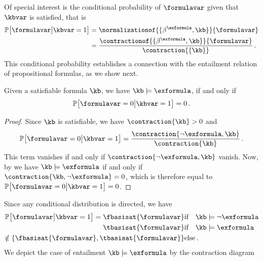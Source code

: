 % 
Of special interest is the conditional probability of $\formulavar$ given that $\kbvar$ is satisfied, that is
\begin{align*}
    \condprobof{\formulavar}{\kbvar=1}
    & = \normalizationof{\{\bencodingof{\exformula} ,\kb\}}{\formulavar}\\
    & = \frac{\contractionof{\{\bencodingof{\exformula},\kb\}}{\formulavar}}{\contraction{\{\kb\}}} \, .
\end{align*}
This conditional probability establishes a connection with the entailment relation of propositional formulas, as we show next.

%
\begin{theorem}
    \label{the:probEntailment}
    Given a satisfiable formula $\kb$, we have $\kb\models\exformula$, if and only if
    \begin{align*}
        \condprobof{\formulavar=0}{\kbvar=1} = 0 \, .
    \end{align*}
\end{theorem}
\begin{proof}
    Since $\kb$ is satisfiable, we have $\contraction{\kb}>0$ and
    \[ \condprobof{\formulavar=0}{\kbvar=1} = \frac{\contraction{\lnot\exformula,\kb}}{\contraction{\kb}} \, .  \]
    This term vanishes if and only if $\contraction{\lnot\exformula,\kb}$ vanish.
    Now, by  we have $\kb\models\exformula$ if and only if $\contraction{\kb,\lnot\exformula}=0$, which is therefore equal to $\condprobof{\formulavar=0}{\kbvar=1}=0$.
\end{proof}

Since any conditional distribution is directed, we have
\begin{align}
    \condprobof{\formulavar}{\kbvar=1} = %
    \fbasisat{\formulavar}  & \ifspace \kb\models\lnot\exformula \\
    \tbasisat{\formulavar}  & \ifspace \kb\models\exformula \\
    \notin \{\fbasisat{\formulavar},\tbasisat{\formulavar}\} & \text{else}
    \, .
\end{align}
We depict the case of entailment $\kb\models\exformula$ by the contraction diagram
\begin{center}
    
\end{center}

